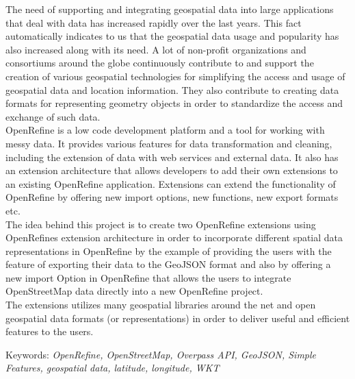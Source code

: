 The need of supporting and integrating geospatial data into large applications that deal with data has increased rapidly over the last years. This fact automatically indicates to us that the geospatial data usage and popularity has also increased along with its need.
A lot of non-profit organizations and consortiums around the globe continuously contribute to and support the creation of
various geospatial technologies for simplifying the access and usage of geospatial data and location information. They also contribute to creating data formats
for representing geometry objects in order to standardize the access and exchange of such data.\\
\newline
OpenRefine is a low code development platform and a tool for working with messy data.
It provides various features for
data transformation and cleaning, including the extension of data with web services and external data.
It also has an extension architecture that allows developers to add their own extensions to an existing OpenRefine application.
Extensions can extend the functionality of OpenRefine by offering new import options, new functions, new export formats etc.\\
\newline
The idea behind this project is to create two OpenRefine extensions using OpenRefine\textquotesingle s extension architecture in order to incorporate
different spatial data representations in OpenRefine by the example of providing the users with the feature of exporting their data to the GeoJSON format
and also by offering a new import Option in OpenRefine that allows the users to integrate OpenStreetMap data directly into a new OpenRefine project.\\
\newline
The extensions utilizes many geospatial libraries around the net and open geospatial data formats (or representations) in order to deliver useful and efficient features to the users.\\
\newline

Keywords: \textit{OpenRefine, OpenStreetMap, Overpass API, GeoJSON, Simple Features, geospatial data, latitude, longitude, WKT}